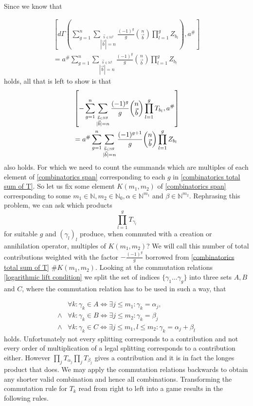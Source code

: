 \documentclass[b5paper,draft,openbib,12pt]{memoir}
\begin{document}
Since we know that 

\begin{align*}
\left[ d\Gamma\left(\sum_{g=1}^n \sum_{\stackrel{\vec{b}\in\mathbb{N}^g}{|\vec{b}|=n}}\frac{(-1)^g}{g} 
\binom{n}{\vec{b}}  \prod_{l=1}^g Z_{b_l}\right), a^\#\right]\\
= a^\# \sum_{g=1}^n \sum_{\stackrel{\vec{b}\in\mathbb{N}^g}{|\vec{b}|=n}}\frac{(-1)^g}{g} 
\binom{n}{\vec{b}}  \prod_{l=1}^g Z_{b_l}
\end{align*}
holds, all that is left to show is that 
\begin{align}\label{combinatorics total commutator}
&\left[-\sum_{g=1}^n \sum_{\stackrel{\vec{b}\in\mathbb{N}^g}{|\vec{b}|=n}}\frac{(-1)^g}{g} 
\binom{n}{\vec{b}} \prod_{l=1}^g T_{b_l}, a^\#\right]\\\notag
&= a^\# \sum_{g=1}^n \sum_{\stackrel{\vec{b}\in\mathbb{N}^g}{|\vec{b}|=n}}\frac{(-1)^{g+1}}{g} 
\binom{n}{\vec{b}}  \prod_{l=1}^g Z_{b_l}
\end{align}
also holds. For which we need to count the summands which are multiples of each element of \eqref{combinatorics span}
 corresponding to each \(g\) in \eqref{combinatorics total sum of T}. So let us fix some element
 \(K(m_1,m_2)\) of \eqref{combinatorics span} corresponding to some \(m_1\in\mathbb{N},
 m_2\in\mathbb{N}_0, \alpha \in \mathbb{N}^{m_1}\) and \( \beta\in \mathbb{N}^{m_2}\).
Rephrasing this problem, we can ask which products
\begin{equation}
\prod_{l=1}^g T_{\gamma_l}
\end{equation}
 for suitable \(g\) and \((\gamma_l)_l\) produce, when commuted with a creation or annihilation operator, 
  multiples of \(K(m_1,m_2)\)? We will call this number of 
 total contributions weighted with the factor 
 \( - \frac{(-1)^g}{g}\) borrowed from \eqref{combinatorics total sum of T} \(\#K(m_1,m_2)\).  
 Looking at the commutation relations 
\eqref{logarithmic lift condition} we split the set of indices \(\{\gamma_1\dots \gamma_g\}\) into
three sets \(A,B\) and \(C\), where the commutation relation has to be used in such a way, that

\begin{align*}
&\forall k: \gamma_k \in A \iff \exists j\le m_1: \gamma_k = \alpha_j, \\
\wedge& \forall k: \gamma_k \in B \iff \exists j\le m_2: \gamma_k = \beta_j\\
\wedge & \forall k: \gamma_k \in C \iff \exists j\le m_1, l\le m_2: \gamma_k = \alpha_j + \beta_l
\end{align*}
 holds. Unfortunately not every splitting corresponds to a contribution and not every
 order of multiplication of a legal splitting corresponds to a contribution either.
 However \(\prod_{j} T_{\alpha_j} \prod_j T_{\beta_j}\) gives
 a contribution and it is in fact the longes product that does.
 We may apply the commutation relations backwards to obtain any
 shorter valid combination and hence all combinations. 
 Transforming the commutation rule for \(T_k\) read from right to left
 into a game results in the following rules.
 
\end{document}
